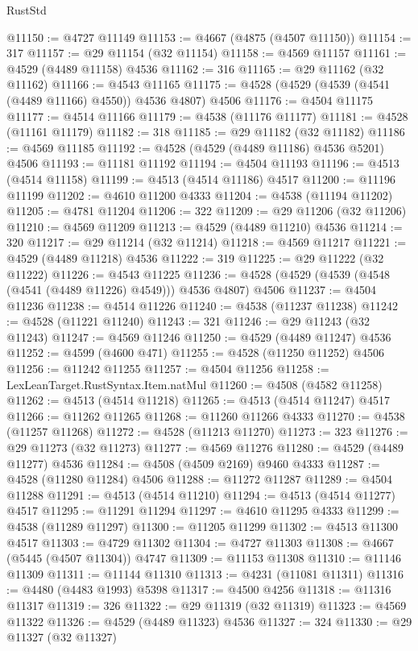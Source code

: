 \begin{lexlean}{RustStd}
\begin{coremodule}
@11150 := @4727 @11149
@11153 := @4667 (@4875 (@4507 @11150))
@11154 := 317
@11157 := @29 @11154 (@32 @11154)
@11158 := @4569 @11157
@11161 := @4529 (@4489 @11158) @4536
@11162 := 316
@11165 := @29 @11162 (@32 @11162)
@11166 := @4543 @11165
@11175 := @4528 (@4529 (@4539 (@4541 (@4489 @11166) @4550)) @4536 @4807) @4506
@11176 := @4504 @11175
@11177 := @4514 @11166
@11179 := @4538 (@11176 @11177)
@11181 := @4528 (@11161 @11179)
@11182 := 318
@11185 := @29 @11182 (@32 @11182)
@11186 := @4569 @11185
@11192 := @4528 (@4529 (@4489 @11186) @4536 @5201) @4506
@11193 := @11181 @11192
@11194 := @4504 @11193
@11196 := @4513 (@4514 @11158)
@11199 := @4513 (@4514 @11186) @4517
@11200 := @11196 @11199
@11202 := @4610 @11200 @4333
@11204 := @4538 (@11194 @11202)
@11205 := @4781 @11204
@11206 := 322
@11209 := @29 @11206 (@32 @11206)
@11210 := @4569 @11209
@11213 := @4529 (@4489 @11210) @4536
@11214 := 320
@11217 := @29 @11214 (@32 @11214)
@11218 := @4569 @11217
@11221 := @4529 (@4489 @11218) @4536
@11222 := 319
@11225 := @29 @11222 (@32 @11222)
@11226 := @4543 @11225
@11236 := @4528 (@4529 (@4539 (@4548 (@4541 (@4489 @11226) @4549))) @4536 @4807) @4506
@11237 := @4504 @11236
@11238 := @4514 @11226
@11240 := @4538 (@11237 @11238)
@11242 := @4528 (@11221 @11240)
@11243 := 321
@11246 := @29 @11243 (@32 @11243)
@11247 := @4569 @11246
@11250 := @4529 (@4489 @11247) @4536
@11252 := @4599 (@4600 @471)
@11255 := @4528 (@11250 @11252) @4506
@11256 := @11242 @11255
@11257 := @4504 @11256
@11258 := LexLeanTarget.RustSyntax.Item.natMul
@11260 := @4508 (@4582 @11258)
@11262 := @4513 (@4514 @11218)
@11265 := @4513 (@4514 @11247) @4517
@11266 := @11262 @11265
@11268 := @11260 @11266 @4333
@11270 := @4538 (@11257 @11268)
@11272 := @4528 (@11213 @11270)
@11273 := 323
@11276 := @29 @11273 (@32 @11273)
@11277 := @4569 @11276
@11280 := @4529 (@4489 @11277) @4536
@11284 := @4508 (@4509 @2169) @9460 @4333
@11287 := @4528 (@11280 @11284) @4506
@11288 := @11272 @11287
@11289 := @4504 @11288
@11291 := @4513 (@4514 @11210)
@11294 := @4513 (@4514 @11277) @4517
@11295 := @11291 @11294
@11297 := @4610 @11295 @4333
@11299 := @4538 (@11289 @11297)
@11300 := @11205 @11299
@11302 := @4513 @11300 @4517
@11303 := @4729 @11302
@11304 := @4727 @11303
@11308 := @4667 (@5445 (@4507 @11304)) @4747
@11309 := @11153 @11308
@11310 := @11146 @11309
@11311 := @11144 @11310
@11313 := @4231 (@11081 @11311)
@11316 := @4480 (@4483 @1993) @5398
@11317 := @4500 @4256
@11318 := @11316 @11317
@11319 := 326
@11322 := @29 @11319 (@32 @11319)
@11323 := @4569 @11322
@11326 := @4529 (@4489 @11323) @4536
@11327 := 324
@11330 := @29 @11327 (@32 @11327)

\end{coremodule}
\end{lexlean}
